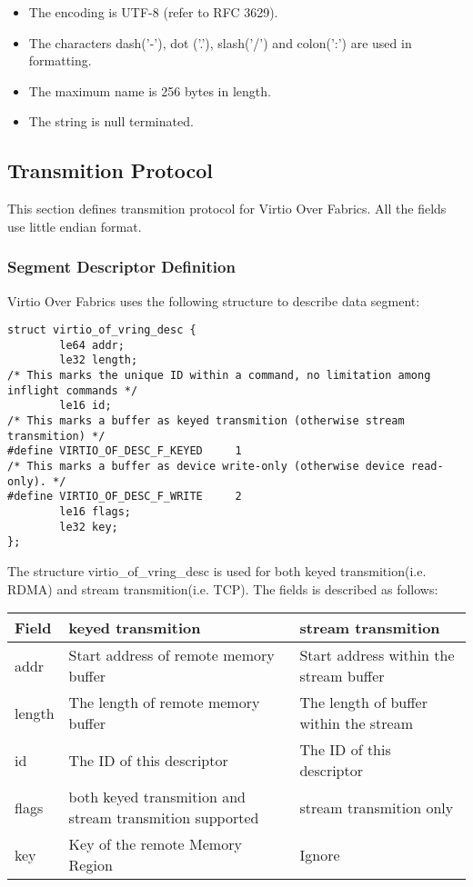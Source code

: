 \begin{itemize}
\item The encoding is UTF-8 (refer to RFC 3629).
\item The characters dash('-'), dot ('.'), slash('/') and colon(':') are used in formatting.
\item The maximum name is 256 bytes in length.
\item The string is null terminated.
\end{itemize}

\subsection{Transmition Protocol}\label{sec:Virtio Transport Options / Virtio Over Fabrics / Transmition Protocol}
This section defines transmition protocol for Virtio Over Fabrics. All the fields use little endian format.

\subsubsection{Segment Descriptor Definition}\label{sec:Virtio Transport Options / Virtio Over Fabrics / Transmition Protocol / Segment Descriptor Definition}
Virtio Over Fabrics uses the following structure to describe data segment:

\begin{lstlisting}
struct virtio_of_vring_desc {
        le64 addr;
        le32 length;
/* This marks the unique ID within a command, no limitation among inflight commands */
        le16 id;
/* This marks a buffer as keyed transmition (otherwise stream transmition) */
#define VIRTIO_OF_DESC_F_KEYED     1
/* This marks a buffer as device write-only (otherwise device read-only). */
#define VIRTIO_OF_DESC_F_WRITE     2
        le16 flags;
        le32 key;
};
\end{lstlisting}

The structure virtio_of_vring_desc is used for both keyed transmition(i.e. RDMA) and stream transmition(i.e. TCP). The fields is described as follows:

\begin{tabular}{ |l|l|l| }
\hline
Field & keyed transmition & stream transmition \\
\hline \hline
addr & Start address of remote memory buffer & Start address within the stream buffer \\
\hline
length & The length of remote memory buffer & The length of buffer within the stream \\
\hline
id & The ID of this descriptor & The ID of this descriptor \\
\hline
flags & both keyed transmition and stream transmition supported & stream transmition only \\
\hline
key & Key of the remote Memory Region & Ignore \\
\hline
\end{tabular}

